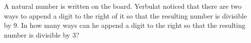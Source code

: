 A natural number is written on the board. Yerbulat noticed that there are two ways to append a digit to the right of it so that the resulting number is divisible by $9$. In how many ways can he append a digit to the right so that the resulting number is divisible by $3$?
